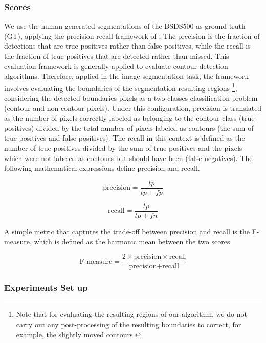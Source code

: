 \subsubsection{Scores}
We use the human-generated segmentations of the BSDS500 as ground truth (GT), applying the precision-recall framework of \cite{Martin.Fowlkes.ea:PAMI:2004}. The precision is the fraction of detections that are true positives rather than false positives, while the recall is the fraction of true positives that are detected rather than missed. This evaluation framework is generally applied to evaluate contour detection algorithms. Therefore, applied in the image segmentation task, the framework involves evaluating the boundaries of the segmentation resulting regions \footnote{Note that for evaluating the resulting regions of our algorithm, we do not carry out any post-processing of the resulting boundaries to correct, for example, the slightly moved contours.}, considering the detected boundaries pixels as a two-classes classification problem (contour and non-contour pixels). Under this configuration, precision is translated as the number of pixels correctly labeled as belonging to the contour class (true positives) divided by the total number of pixels labeled as contours (the sum of true positives and false positives). The recall in this context is defined as the number of true positives divided by the sum of true positives and the pixels which were not labeled as contours but should have been (false negatives). The following mathematical expressions define precision and recall.

\begin{equation}\label{eq:precision_score}
    \text{precision} = \frac{tp}{tp+fp}
\end{equation}

\begin{equation}\label{eq:recall_score}
    \text{recall} = \frac{tp}{tp+fn}
\end{equation}

A simple metric that captures the trade-off between precision and recall is the F-measure, which is defined as the harmonic mean between the two scores.

\begin{equation}\label{eq:f_score}
    \text{F-measure} = \frac{2 \times \text{precision}\times\text{recall}}{\text{precision} + \text{recall}}
\end{equation}


\subsubsection{Experiments Set up}

